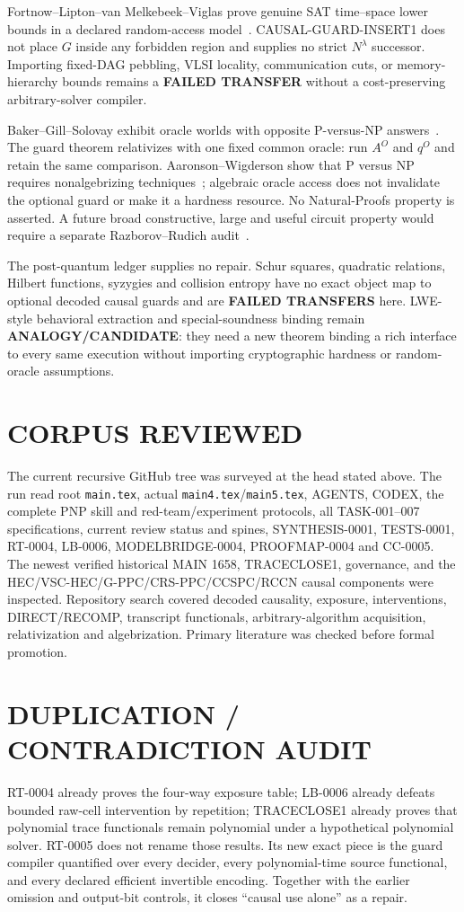 \documentclass[11pt]{article}
\begin{document}
Fortnow--Lipton--van Melkebeek--Viglas prove genuine SAT time--space lower
bounds in a declared random-access model~\cite{flmv}.  CAUSAL-GUARD-INSERT1
does not place $G$ inside any forbidden region and supplies no strict
$N^\lambda$ successor.  Importing fixed-DAG pebbling, VLSI locality,
communication cuts, or memory-hierarchy bounds remains a \textbf{FAILED
TRANSFER} without a cost-preserving arbitrary-solver compiler.

Baker--Gill--Solovay exhibit oracle worlds with opposite P-versus-NP
answers~\cite{bgs}.  The guard theorem relativizes with one fixed common
oracle: run $A^O$ and $q^O$ and retain the same comparison.  Aaronson--Wigderson
show that P versus NP requires nonalgebrizing techniques~\cite{aw}; algebraic
oracle access does not invalidate the optional guard or make it a hardness
resource.  No Natural-Proofs property is asserted.  A future broad
constructive, large and useful circuit property would require a separate
Razborov--Rudich audit~\cite{rr}.

The post-quantum ledger supplies no repair.  Schur squares, quadratic
relations, Hilbert functions, syzygies and collision entropy have no exact
object map to optional decoded causal guards and are \textbf{FAILED
TRANSFERS} here.  LWE-style behavioral extraction and special-soundness
binding remain \textbf{ANALOGY/CANDIDATE}: they need a new theorem binding a
rich interface to every same execution without importing cryptographic
hardness or random-oracle assumptions.

\section{CORPUS REVIEWED}
The current recursive GitHub tree was surveyed at the head stated above.  The
run read root \texttt{main.tex}, actual \texttt{main4.tex}/\texttt{main5.tex},
AGENTS, CODEX, the complete PNP skill and red-team/experiment protocols, all
TASK-001--007 specifications, current review status and spines, SYNTHESIS-0001,
TESTS-0001, RT-0004, LB-0006, MODELBRIDGE-0004, PROOFMAP-0004 and CC-0005.
The newest verified historical MAIN 1658, TRACECLOSE1, governance, and the
HEC/VSC-HEC/G-PPC/CRS-PPC/CCSPC/RCCN causal components were inspected.
Repository search covered decoded causality, exposure, interventions,
DIRECT/RECOMP, transcript functionals, arbitrary-algorithm acquisition,
relativization and algebrization.  Primary literature was checked before
formal promotion.

\section{DUPLICATION / CONTRADICTION AUDIT}
RT-0004 already proves the four-way exposure table; LB-0006 already defeats
bounded raw-cell intervention by repetition; TRACECLOSE1 already proves that
polynomial trace functionals remain polynomial under a hypothetical
polynomial solver.  RT-0005 does not rename those results.  Its new exact
piece is the guard compiler quantified over every decider, every
polynomial-time source functional, and every declared efficient invertible
encoding.  Together with the earlier omission and output-bit controls, it
closes ``causal use alone'' as a repair.
\end{document}
